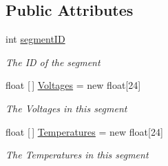 \subsection*{Public Attributes}
\begin{DoxyCompactItemize}
\item 
int \hyperlink{class_accumulator_monitor_m017_1_1_backend_1_1_data_frame_a4fcbe51325eb48b630b97203cdeb3881}{segment\+ID}
\begin{DoxyCompactList}\small\item\em The ID of the segment \end{DoxyCompactList}\item 
float \mbox{[}$\,$\mbox{]} \hyperlink{class_accumulator_monitor_m017_1_1_backend_1_1_data_frame_a0fa7302afaeb967b384a15dd0fc78a45}{Voltages} = new float\mbox{[}24\mbox{]}
\begin{DoxyCompactList}\small\item\em The Voltages in this segment \end{DoxyCompactList}\item 
float \mbox{[}$\,$\mbox{]} \hyperlink{class_accumulator_monitor_m017_1_1_backend_1_1_data_frame_a5ad50f192c05e22c4719187f005d2edb}{Temperatures} = new float\mbox{[}24\mbox{]}
\begin{DoxyCompactList}\small\item\em The Temperatures in this segment \end{DoxyCompactList}\end{DoxyCompactItemize}
